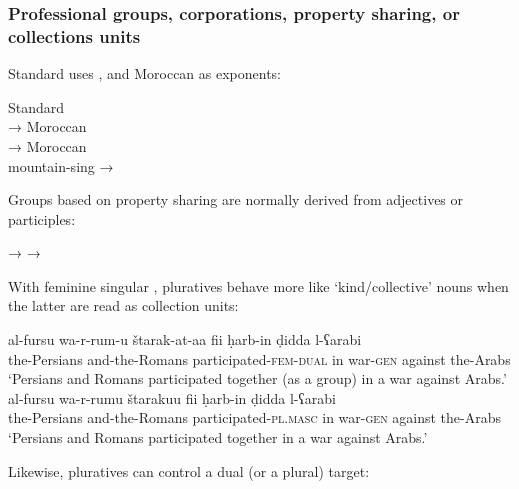 \subsubsection{Professional groups, corporations, property sharing, or collections units}

Standard  uses , and Moroccan   as exponents:

\begin{exe}
  \ex\label{ex:fassi:20} Standard \\
   → 
  \ex\label{ex:fassi:21} Moroccan \\
   → 
  \ex\label{ex:fassi:22} Moroccan \\
   mountain-sing  → 
\end{exe}
%
Groups based on property sharing are normally derived from adjectives or
participles:

\begin{exe}
  \ex\label{ex:fassi:23}
  \begin{xlist}
    \ex\label{ex:fassi:23a}  → 
    \ex\label{ex:fassi:23b}  → 
  \end{xlist}
\end{exe}
%
With feminine singular , pluratives behave more like `kind/collective'
nouns when the latter are read as collection units:

\begin{exe}
  \ex\label{ex:fassi:24}
  \begin{xlist}
    \ex\label{ex:fassi:24a}
    \gll al-fursu wa-r-rum-u \v{s}tarak-at-aa fii \d{h}arb-in \d{d}idda l-ʕarabi\\
    the-Persians and-the-Romans participated-\textsc{fem-dual} in war-\textsc{gen} against the-Arabs\\
    \glt `Persians and Romans participated together (as a group) in a war against Arabs.'\\
    \ex\label{ex:fassi:24b}
    \gll al-fursu wa-r-rumu \v{s}tarakuu fii \d{h}arb-in \d{d}idda l-ʕarabi\\
    the-Persians and-the-Romans participated-\textsc{pl.masc} in war-\textsc{gen} against the-Arabs\\
    \glt `Persians and Romans participated together in a war against Arabs.'\\
  \end{xlist}
\end{exe}
%
Likewise, pluratives can control a dual (or a plural) target:

